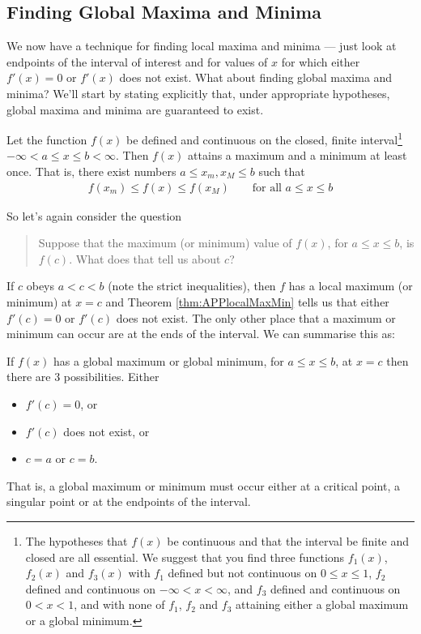 \subsection{Finding Global Maxima and Minima}\label{ssec find maxmin}
We now have a technique for finding local maxima and minima --- just look
at endpoints of the interval of interest and 
for values of $x$ for which either $f'(x)=0$ or $f'(x)$ does not exist.
What about finding global maxima and minima? We'll start by stating
explicitly that, under appropriate hypotheses, global maxima
and minima are guaranteed to exist.
\begin{theorem}\label{thm:APPglobalMaxMinExist}
Let the function $f(x)$ be defined and continuous on the closed,
finite interval\footnote{The hypotheses that $f(x)$ be continuous
and that the interval be finite and closed are all essential.
We suggest that you find three functions $f_1(x)$, $f_2(x)$ and
$f_3(x)$ with $f_1$ defined but not continuous on $0\le x\le 1$,
$f_2$ defined and continuous on $-\infty<x<\infty$, and $f_3$ defined
and continuous on $0<x<1$, and with none of $f_1$, $f_2$ and $f_3$
attaining either a global maximum or a global minimum.}
$-\infty<a\le x\le b<\infty$. Then $f(x)$ attains
a maximum and a minimum at least once. That is, there exist
numbers $a\le x_m, x_M\le b$ such that
\begin{align*}
f(x_m)\le f(x)\le f(x_M)
\qquad\text{for all }a\le x\le b
\end{align*}
\end{theorem}
So let's again consider the
question
\begin{quote}
Suppose that the maximum (or minimum) value of $f(x)$, for $a\le x\le b$, is $f(c)$.
What does that tell us about $c$?
\end{quote}
If $c$ obeys $a<c<b$ (note the strict inequalities), then $f$ has
a local maximum (or minimum) at $x=c$ and Theorem  \ref{thm:APPlocalMaxMin}
tells us that either $f'(c)=0$ or $f'(c)$ does not exist. The only other place that a
maximum or minimum can occur are at the ends of the interval. We can summarise this as:
\begin{theorem}\label{thm:APPglobalMaxMin}
If $f(x)$ has a global maximum or global minimum, for $a\le x\le b$,
at $x=c$ then there are 3 possibilities. Either
\begin{itemize}
\item $f'(c)=0$, or
\item $f'(c)$ does not exist, or
\item $c=a$ or $c=b$.
\end{itemize}
That is, a global maximum or minimum must occur either at a critical point, a singular
point or at the endpoints of the interval.
\end{theorem}

